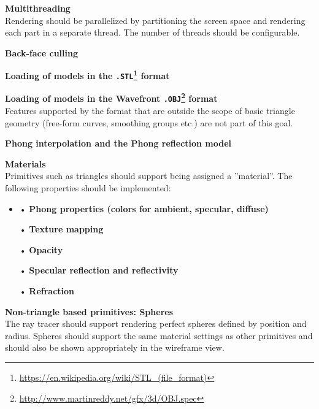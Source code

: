 \documentclass[a4paper,11pt]{article}
\begin{document}
\noindent \textbf{Multithreading}\\
Rendering should be parallelized by partitioning the screen space and rendering
each part in a separate thread. The number of threads should be configurable.

\noindent \textbf{Back-face culling}

\noindent \textbf{Loading of models in the \texttt{.STL}\footnote{\url{https://en.wikipedia.org/wiki/STL\_(file\_format)}} format}

\noindent \textbf{Loading of models in the Wavefront \texttt{.OBJ}\footnote{\url{http://www.martinreddy.net/gfx/3d/OBJ.spec}} format}\\
Features supported by the format that are outside the scope of basic triangle geometry (free-form
curves, smoothing groups etc.) are not part of this goal.

\noindent \textbf{Phong interpolation and the Phong reflection model}

\noindent \textbf{Materials}\\
Primitives such as triangles should support being assigned a ''material''.
The following properties should be implemented:
\vspace{-.3cm}

\begin{itemize}
\item[]\noindent \hspace{-.5cm} • \textbf{Phong properties (colors for ambient, specular, diffuse)}
\vspace{-.2cm}

\noindent \hspace{-.5cm} • \textbf{Texture mapping}
\vspace{-.2cm}

\noindent \hspace{-.5cm} • \textbf{Opacity}
\vspace{-.2cm}

\noindent \hspace{-.5cm} • \textbf{Specular reflection and reflectivity}
\vspace{-.2cm}

\noindent \hspace{-.5cm} • \textbf{Refraction}
\end{itemize}

\noindent \textbf{Non-triangle based primitives: Spheres}\\
The ray tracer should support rendering perfect spheres defined by position and radius.
Spheres should support the same material settings as other primitives and should also be
shown appropriately in the wireframe view.
\end{document}
